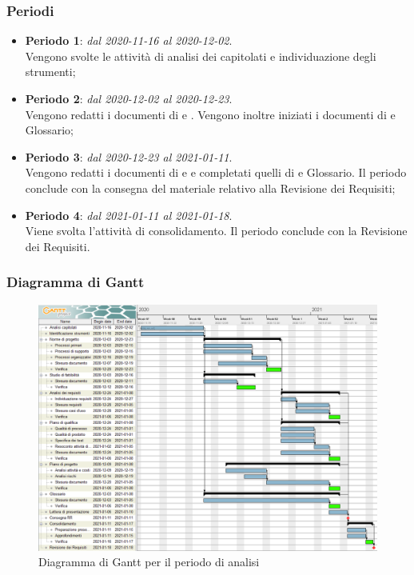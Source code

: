 \subsubsection{Periodi}

\begin{itemize}
\item \textbf{Periodo 1}: \textit{dal 2020-11-16 al 2020-12-02}. \\
Vengono svolte le attività di analisi dei capitolati e individuazione degli strumenti;
\item \textbf{Periodo 2}: \textit{dal 2020-12-02 al 2020-12-23}. \\
Vengono redatti i documenti di \NdP{} e \SdF{}. Vengono inoltre iniziati i documenti di \PdP{} e Glossario;
\item \textbf{Periodo 3}: \textit{dal 2020-12-23 al 2021-01-11}. \\
Vengono redatti i documenti di \PdQ{} e \AdR{} e completati quelli di \PdP{} e Glossario. Il periodo conclude con la consegna del materiale relativo alla Revisione dei Requisiti;
\item \textbf{Periodo 4}: \textit{dal 2021-01-11 al 2021-01-18}. \\
Viene svolta l'attività di consolidamento. Il periodo conclude con la Revisione dei Requisiti.
\end{itemize}

\subsubsection{Diagramma di Gantt}

\begin{figure}[H]
\centering

\centerline{\includegraphics[scale=0.6]{res/Pianificazione/Gantt/analisi}}
\caption{Diagramma di Gantt per il periodo di analisi}
\end{figure}